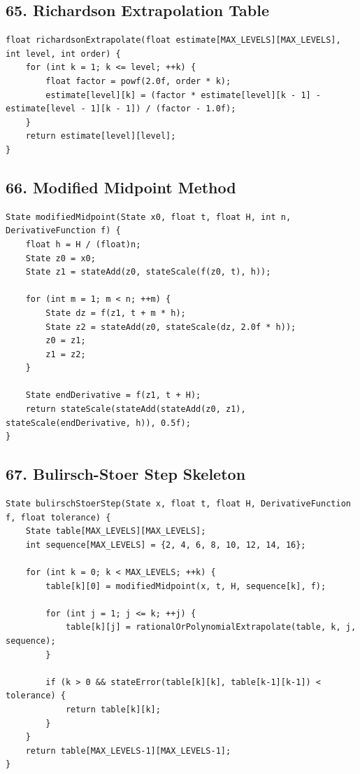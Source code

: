 \documentclass[10pt,letterpaper]{article}
\begin{document}
\subsection*{65. Richardson Extrapolation Table}

\begin{verbatim}
float richardsonExtrapolate(float estimate[MAX_LEVELS][MAX_LEVELS], int level, int order) {
    for (int k = 1; k <= level; ++k) {
        float factor = powf(2.0f, order * k);
        estimate[level][k] = (factor * estimate[level][k - 1] - estimate[level - 1][k - 1]) / (factor - 1.0f);
    }
    return estimate[level][level];
}
\end{verbatim}

\subsection*{66. Modified Midpoint Method}

\begin{verbatim}
State modifiedMidpoint(State x0, float t, float H, int n, DerivativeFunction f) {
    float h = H / (float)n;
    State z0 = x0;
    State z1 = stateAdd(z0, stateScale(f(z0, t), h));

    for (int m = 1; m < n; ++m) {
        State dz = f(z1, t + m * h);
        State z2 = stateAdd(z0, stateScale(dz, 2.0f * h));
        z0 = z1;
        z1 = z2;
    }

    State endDerivative = f(z1, t + H);
    return stateScale(stateAdd(stateAdd(z0, z1), stateScale(endDerivative, h)), 0.5f);
}
\end{verbatim}

\subsection*{67. Bulirsch-Stoer Step Skeleton}

\begin{verbatim}
State bulirschStoerStep(State x, float t, float H, DerivativeFunction f, float tolerance) {
    State table[MAX_LEVELS][MAX_LEVELS];
    int sequence[MAX_LEVELS] = {2, 4, 6, 8, 10, 12, 14, 16};

    for (int k = 0; k < MAX_LEVELS; ++k) {
        table[k][0] = modifiedMidpoint(x, t, H, sequence[k], f);

        for (int j = 1; j <= k; ++j) {
            table[k][j] = rationalOrPolynomialExtrapolate(table, k, j, sequence);
        }

        if (k > 0 && stateError(table[k][k], table[k-1][k-1]) < tolerance) {
            return table[k][k];
        }
    }
    return table[MAX_LEVELS-1][MAX_LEVELS-1];
}
\end{verbatim}
\end{document}

